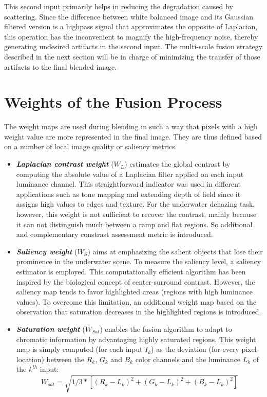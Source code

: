\documentclass[hidelinks, 12pt]{report}
\begin{document}
This second input primarily helps in reducing the degradation caused by scattering. Since the difference between white balanced image and its Gaussian filtered version is a highpass signal that approximates the opposite of Laplacian, this operation has the inconvenient to magnify the high-frequency noise, thereby generating undesired artifacts in the second input. The multi-scale fusion strategy described in the next section will be in charge of minimizing the transfer of those artifacts to the final blended image.

\section{Weights of the Fusion Process}
The weight maps are used during blending in such a way that pixels with a high weight value are more represented in the final image. They are thus defined based on a number of local image quality or saliency metrics.
\begin{itemize}
\item{\textbf{\textit{Laplacian contrast weight}} ($W_L$) estimates the global contrast by computing the absolute value of a Laplacian filter applied on each input luminance channel. This straightforward indicator was used in different applications such as tone mapping and extending depth of field since it assigns high values to edges and texture. For the underwater dehazing task, however, this weight is not sufficient to recover the contrast, mainly because it can not distinguish much between a ramp and flat regions. So additional and complementary constrast assessment metric is introduced.}
\item{\textbf{\textit{Saliency weight}} ($W_S$) aims at emphasizing the salient objects that lose their prominence in the underwater scene. To measure the saliency level, a saliency estimator is employed. This computationally efficient algorithm has been inspired by the biological concept of center-surround contrast. However, the saliency map tends to favor highlighted areas (regions with high luminance values). To overcome this limitation, an additional weight map based on the observation that saturation decreases in the highlighted regions is introduced.}
\item{\textbf{\textit{Saturation weight}} ($W_{Sat}$) enables the fusion algorithm to adapt to chromatic information by advantaging highly saturated regions. This weight map is simply computed (for each input $I_k$) as the deviation (for every pixel location) between the $R_k$, $G_k$ and $B_k$ color channels and the luminance $L_k$ of the $k^{th}$ input:
\begin{equation}
W_{sat}=\sqrt{1/3*[(R_k-L_k)^2+(G_k-L_k)^2+(B_k-L_k)^2]}
\end{equation}
}
\end{itemize}
\end{document}
